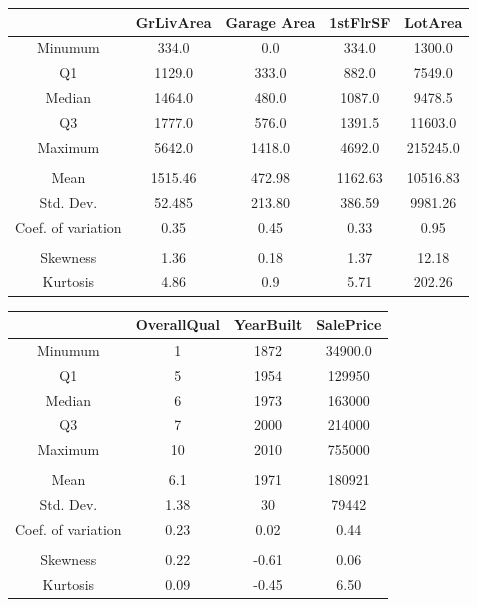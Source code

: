 \documentclass[12pt]{article}
\begin{document}
{    \begin{table}
        \centering
        \begin{tabular}{c|cccc}
        \hline
             & GrLivArea  & Garage Area & 1stFlrSF & LotArea  \\
             \hline
             Minumum & 334.0 & 0.0 & 334.0 &  1300.0 \\
             Q1 & 1129.0 & 333.0 & 882.0 &  7549.0 \\
             Median & 1464.0 & 480.0 & 1087.0 &  9478.5 \\
             Q3 & 1777.0 & 576.0 & 1391.5 &  11603.0 \\
             Maximum & 5642.0 & 1418.0 & 4692.0 &  215245.0 \\
             &  &  &  &   \\
             Mean & 1515.46 & 472.98 & 1162.63 & 10516.83  \\
             Std. Dev.& 52.485 & 213.80 & 386.59 &  9981.26 \\
             Coef. of variation & 0.35 & 0.45 & 0.33 & 0.95 \\
             &  &  &  &   \\
             Skewness& 1.36 & 0.18 & 1.37 &  12.18 \\
             Kurtosis & 4.86 & 0.9 & 5.71 &   202.26 \\
             \hline
        \end{tabular}
        \label{tab:table}
    \end{table}

    \begin{table}
        \centering
        \begin{tabular}{c|ccc}
             \hline
             &  OverallQual & YearBuilt & SalePrice \\
             \hline
             Minumum & 1 & 1872 &  34900.0 \\
             Q1 & 5 & 1954 & 129950  \\
             Median & 6 & 1973 & 163000  \\
             Q3 & 7 & 2000 & 214000  \\
             Maximum & 10 & 2010 & 755000  \\
             &  &  &   \\
             Mean & 6.1 & 1971 &  180921 \\
             Std. Dev.& 1.38 & 30 &  79442 \\
             Coef. of variation & 0.23 & 0.02 &  0.44 \\
             &  &  &  \\
             Skewness& 0.22 & -0.61 & 0.06  \\
             Kurtosis & 0.09 & -0.45 &  6.50 \\
             \hline
        \end{tabular}
        \label{tab:table}
    \end{table}
    
}
\end{document}
